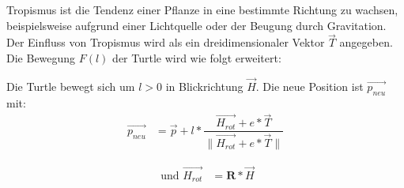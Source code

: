 Tropismus ist die Tendenz einer Pflanze in eine bestimmte Richtung zu wachsen, beispielsweise aufgrund einer Lichtquelle oder der Beugung durch Gravitation.\cite[Abschn. 3]{SpaceColonizationAlgorithm:07} Der Einfluss von Tropismus wird als ein dreidimensionaler Vektor $\overrightarrow{T}$ angegeben. Die Bewegung $F(l)$ der Turtle wird wie folgt erweitert:

\begin{description}[labelindent]
	\item[\boldmath$F(l)$]  Die Turtle bewegt sich um $l>0$ in Blickrichtung $\overrightarrow{H}$. Die neue Position ist $\overrightarrow{p_{neu}}$ mit:
	\begin{equation}
	\begin{array}{ll}
	\overrightarrow{p_{neu}} & = \overrightarrow{p} + l * \dfrac{\overrightarrow{H_{rot}} + e * \overrightarrow{T} }{\lVert \overrightarrow{H_{rot}} + e * \overrightarrow{T} \rVert} 
	\end{array}
	\end{equation} 
	
	\begin{equation}
	\begin{array}{ll}
	\text{ und } \overrightarrow{H_{rot}} & = \boldsymbol{R} * \overrightarrow{H}
	\end{array}
	\end{equation} 
	
\end{description}

